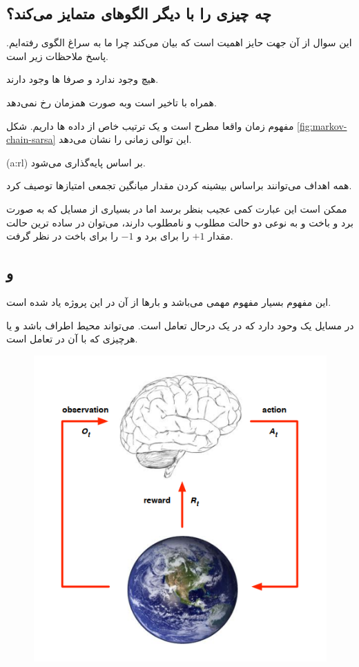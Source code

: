 \subsection[وجه تمایز 
\ws{rl}
از دیگر الگو‌های 
\ws{ml}
]{چه چیزی 
را با دیگر الگوهای 
متمایز می‌کند؟
}

این سوال از آن جهت حایز اهمیت است که بیان می‌کند چرا ما به سراغ الگوی 
رفته‌ایم. پاسخ ملاحظات زیر است.

\begin{alphabetlist}
\item هیچ 
وجود ندارد و صرفا ها وجود دارند.
\item 
{}
همراه با تاخیر است وبه صورت همزمان رخ نمی‌دهد.
\item 
مفهوم زمان واقعا مطرح است و یک ترتیب خاص از داده ها داریم.
شکل \ref{fig:markov-chain-sarsa} این توالی زمانی را نشان می‌دهد.
\end{alphabetlist}

(\gls{a:rl})
بر اساس  پایه‌گذاری می‌شود.
\begin{definition}[\w{rewardhypo}]
	همه اهداف می‌توانند براساس بیشینه کردن مقدار میانگین تجمعی امتیازها توصیف کرد.
\end{definition}

ممکن است این عبارت کمی عجیب بنظر برسد اما در بسیاری از مسایل که به صورت برد و باخت و به نوعی دو حالت مطلوب و نامطلوب دارند، می‌توان در ساده ترین حالت مقدار $+1$ را برای برد و $-1$ را برای باخت در نظر گرفت.

\subsection{
 و 
}
 
 این مفهوم بسیار مفهوم مهمی می‌باشد و بارها از آن در این پروژه یاد شده است.
 
 در مسایل  یک 
 \textbf{}
 وحود دارد که در یک \textbf{} درحال تعامل است.  می‌تواند محیط اطراف  باشد و یا هرچیزی که  با آن در تعامل است.
  \cite{uclRL}
\begin{figure}[t]
	\centering
	\includegraphics[width=0.7\linewidth]{Figures/RL/Enviroment-brain-as-agent}
	\caption{}
	\label{fig:enviroment-brain-as-agent}
\end{figure}

